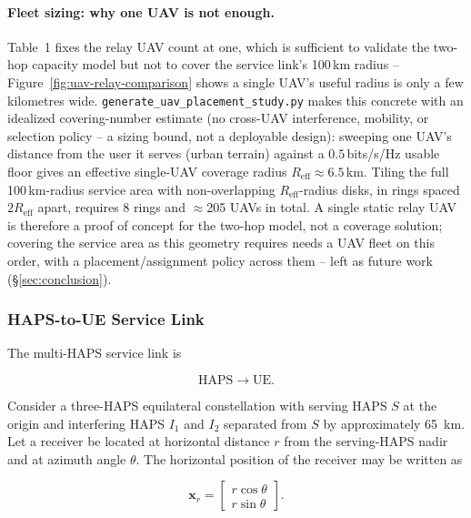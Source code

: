 \documentclass[conference]{IEEEtran}
\begin{document}
\paragraph{Fleet sizing: why one UAV is not enough.} Table~1 fixes the relay UAV count at
one, which is sufficient to validate the two-hop capacity model but not to cover the
service link's 100\,km radius -- Figure~\ref{fig:uav-relay-comparison} shows a single UAV's
useful radius is only a few kilometres wide. \texttt{generate\_uav\_placement\_study.py}
makes this concrete with an idealized covering-number estimate (no cross-UAV interference,
mobility, or selection policy -- a sizing bound, not a deployable design): sweeping one
UAV's distance from the user it serves (urban terrain) against a $0.5$\,bits/s/Hz usable
floor gives an effective single-UAV coverage radius $R_{\text{eff}}\approx6.5$\,km.
Tiling the full 100\,km-radius service area with non-overlapping $R_{\text{eff}}$-radius
disks, in rings spaced $2R_{\text{eff}}$ apart, requires 8 rings and
$\approx$205 UAVs in total. A single static relay UAV is therefore a proof of concept for
the two-hop model, not a coverage solution; covering the service area as this geometry
requires needs a UAV fleet on this order, with a placement/assignment policy across them
-- left as future work (\S\ref{sec:conclusion}).

\subsubsection{HAPS-to-UE Service Link}

The multi-HAPS service link is

\begin{equation}
\mathrm{HAPS}\rightarrow\mathrm{UE}.
\end{equation}

Consider a three-HAPS equilateral constellation with serving HAPS $S$ at the origin and interfering HAPS $I_1$ and $I_2$ separated from $S$ by approximately 65~km. Let a receiver be located at horizontal distance $r$ from the serving-HAPS nadir and at azimuth angle $\theta$. The horizontal position of the receiver may be written as

\begin{equation}
\mathbf{x}_r = \begin{bmatrix} r\cos\theta\\r\sin\theta\end{bmatrix}.
\end{equation}
\end{document}
